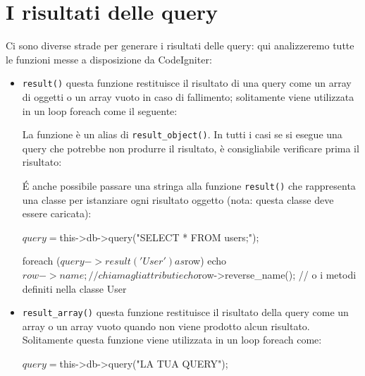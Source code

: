 \section*{I risultati delle query}
Ci sono diverse strade per generare i risultati delle query: qui analizzeremo tutte le funzioni messe a disposizione da CodeIgniter:

\begin{itemize}
\item \verb|result()| questa funzione restituisce il risultato di una query come un array di oggetti o un array vuoto in caso di fallimento; solitamente viene utilizzata in un loop foreach come il seguente:


La funzione è un alias di \verb|result_object()|. In tutti i casi se si esegue una query che potrebbe non produrre il risultato, è consigliabile verificare prima il risultato:


\'E anche possibile passare una stringa alla funzione \verb|result()| che rappresenta una classe per istanziare ogni risultato oggetto (nota: questa classe deve essere caricata):

\begin{code}
$query = $this->db->query("SELECT * FROM users;");

foreach ($query->result('User') as $row)
{
   echo $row->name; // chiama gli attributi
   echo $row->reverse_name(); // o i metodi definiti nella classe User
}
\end{code}

\item \verb|result_array()| questa funzione restituisce il risultato della query come un array o un array vuoto quando non viene prodotto alcun risultato. Solitamente questa funzione viene utilizzata in un loop foreach come:

\begin{code}
$query = $this->db->query("LA TUA QUERY");


\end{code}
\end{itemize}
